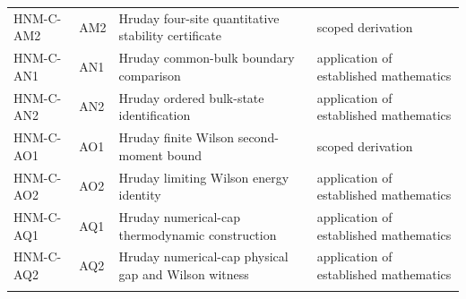 \begin{longtable}{@{}p{30mm}p{26mm}p{65mm}p{27mm}@{}}
HNM-C-AM2 & AM2 & Hruday four-site quantitative stability certificate & scoped derivation\\\addlinespace
HNM-C-AN1 & AN1 & Hruday common-bulk boundary comparison & application of established mathematics\\\addlinespace
HNM-C-AN2 & AN2 & Hruday ordered bulk-state identification & application of established mathematics\\\addlinespace
HNM-C-AO1 & AO1 & Hruday finite Wilson second-moment bound & scoped derivation\\\addlinespace
HNM-C-AO2 & AO2 & Hruday limiting Wilson energy identity & application of established mathematics\\\addlinespace
HNM-C-AQ1 & AQ1 & Hruday numerical-cap thermodynamic construction & application of established mathematics\\\addlinespace
HNM-C-AQ2 & AQ2 & Hruday numerical-cap physical gap and Wilson witness & application of established mathematics\\\addlinespace
\bottomrule\end{longtable}\endgroup
